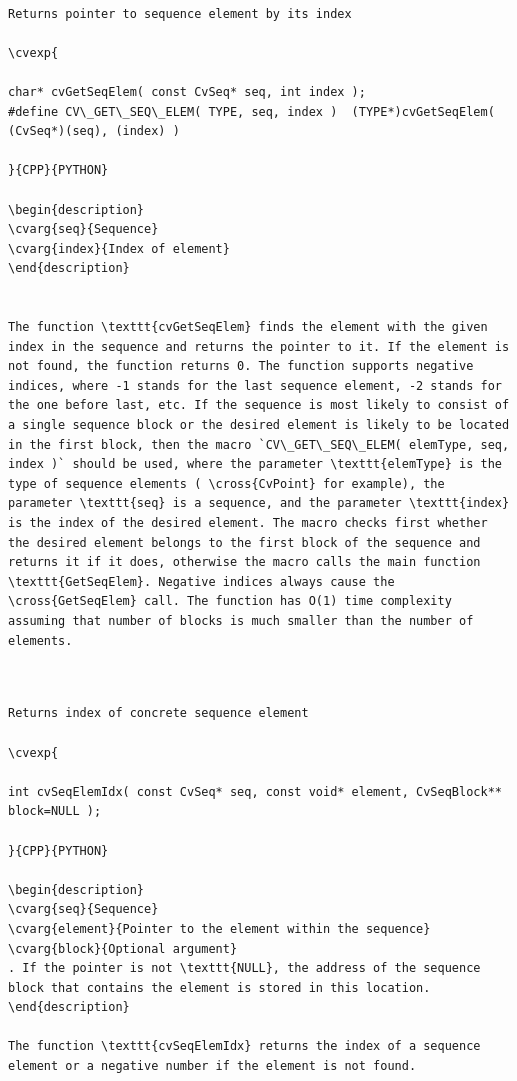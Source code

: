 \begin{verbatim}

Returns pointer to sequence element by its index

\cvexp{

char* cvGetSeqElem( const CvSeq* seq, int index );
#define CV\_GET\_SEQ\_ELEM( TYPE, seq, index )  (TYPE*)cvGetSeqElem( (CvSeq*)(seq), (index) )

}{CPP}{PYTHON}

\begin{description}
\cvarg{seq}{Sequence}
\cvarg{index}{Index of element}
\end{description}


The function \texttt{cvGetSeqElem} finds the element with the given index in the sequence and returns the pointer to it. If the element is not found, the function returns 0. The function supports negative indices, where -1 stands for the last sequence element, -2 stands for the one before last, etc. If the sequence is most likely to consist of a single sequence block or the desired element is likely to be located in the first block, then the macro `CV\_GET\_SEQ\_ELEM( elemType, seq, index )` should be used, where the parameter \texttt{elemType} is the type of sequence elements ( \cross{CvPoint} for example), the parameter \texttt{seq} is a sequence, and the parameter \texttt{index} is the index of the desired element. The macro checks first whether the desired element belongs to the first block of the sequence and returns it if it does, otherwise the macro calls the main function \texttt{GetSeqElem}. Negative indices always cause the \cross{GetSeqElem} call. The function has O(1) time complexity assuming that number of blocks is much smaller than the number of elements.


\end{verbatim}
\label{SeqElemIdx}
\begin{verbatim}

Returns index of concrete sequence element

\cvexp{

int cvSeqElemIdx( const CvSeq* seq, const void* element, CvSeqBlock** block=NULL );

}{CPP}{PYTHON}

\begin{description}
\cvarg{seq}{Sequence}
\cvarg{element}{Pointer to the element within the sequence}
\cvarg{block}{Optional argument}
. If the pointer is not \texttt{NULL}, the address of the sequence block that contains the element is stored in this location.
\end{description}

The function \texttt{cvSeqElemIdx} returns the index of a sequence element or a negative number if the element is not found.


\end{verbatim}
